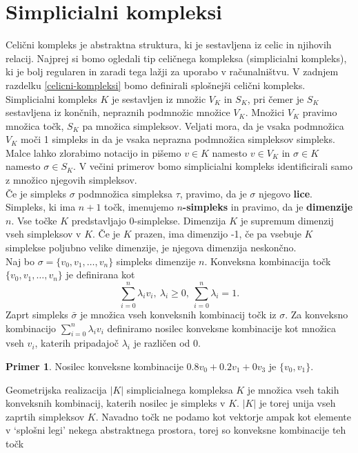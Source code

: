 \documentclass[a4paper, 12pt]{book}
\theoremstyle{definition}
\newtheorem{example}{Primer}[section]
\theoremstyle{remark}
\begin{document}
\section{Simplicialni kompleksi}
Celični kompleks je abstraktna struktura, ki je sestavljena iz celic in njihovih
relacij. Najprej si bomo ogledali tip celičnega kompleksa (simplicialni kompleks),
ki je bolj regularen in zaradi tega lažji za uporabo v računalništvu. V zadnjem 
razdelku \ref{celicni-kompleksi} bomo definirali splošnejši celični kompleks.\\
Simplicialni kompleks $K$ je sestavljen iz množic $V_K$ in $S_K$, pri čemer je
$S_K$ sestavljena iz končnih, nepraznih podmnožic množice $V_K$.
Množici $V_K$ pravimo množica točk, $S_K$ pa množica simpleksov. Veljati mora, da
je vsaka podmnožica $V_K$ moči 1 simpleks in da je vsaka neprazna podmnožica
simpleksov simpleks. Malce lahko zlorabimo notacijo in pišemo $v \in K$ namesto
$v \in V_K$ in $\sigma \in K$ namesto $\sigma \in S_K$. V večini primerov bomo
simplicialni kompleks identificirali samo z množico njegovih simpleksov.\\
Če je simpleks $\sigma$ podmnožica simpleksa $\tau$, pravimo, da je $\sigma$ njegovo \textbf{lice}.
Simpleks, ki ima $n+1$ točk, imenujemo \textbf{$n$-simpleks} in pravimo, da je \textbf{dimenzije} $n$.
Vse točke $K$ predstavljajo 0-simplekse. Dimenzija $K$ je supremum dimenzij
vseh simpleksov v $K$. Če je $K$ prazen, ima dimenzijo -1, če pa vsebuje $K$ simplekse
poljubno velike dimenzije, je njegova dimenzija neskončno.\\
Naj bo $\sigma = \{v_0,v_1,\dots,v_n\}$ simpleks dimenzije $n$.
Konveksna kombinacija točk $\{v_0,v_1,\dots,v_n\}$ je definirana kot
\[
  \sum_{i=0}^n \lambda_i v_i,\ \lambda_i \geq 0,\ \sum_{i=0}^n \lambda_i = 1.
\]
Zaprt simpleks $\bar{\sigma}$ je množica vseh konveksnih kombinacij točk iz $\sigma$.
Za konveksno kombinacijo $\sum_{i=0}^n \lambda_i v_i$ definiramo nosilec konveksne kombinacije
kot množica vseh $v_i$, katerih pripadajoč $\lambda_i$ je različen od 0.
\begin{example}
  Nosilec konveksne kombinacije $0.8 v_0 + 0.2 v_1 + 0 v_3$ je $\{v_0,v_1\}$.
\end{example}
Geometrijska realizacija $|K|$ simplicialnega kompleksa $K$ je množica 
vseh takih konveksnih kombinacij, katerih nosilec je simpleks v $K$.
$|K|$ je torej unija vseh zaprtih simpleksov $K$.
Navadno točk ne podamo kot vektorje ampak kot elemente v `splošni legi'
nekega abstraktnega prostora, torej so konveksne kombinacije teh točk
\end{document}
